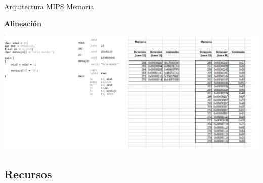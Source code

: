 \documentclass[aspectratio=169,compress]{beamer}
\begin{document}
\begin{frame} {Arquitectura MIPS} {Memoria}


\textbf{Alineación}

\bigskip
    \includegraphics[width=150mm]{images/mips-memory.jpg}


\end{frame}



















\subsection{Recursos}
\end{document}
